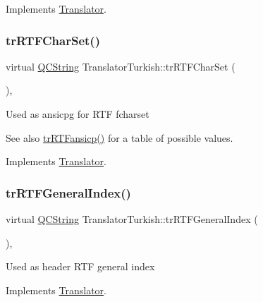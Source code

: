 Implements \mbox{\hyperlink{class_translator_a9953a4c0e6a4fc7d017abcd5c2939e0f}{Translator}}.

\mbox{\label{class_translator_turkish_a6eede957c6533c1d2da465494caf9e15}} 
\subsubsection{\texorpdfstring{trRTFCharSet()}{trRTFCharSet()}}
{\footnotesize\ttfamily virtual \mbox{\hyperlink{class_q_c_string}{Q\+C\+String}} Translator\+Turkish\+::tr\+R\+T\+F\+Char\+Set (\begin{DoxyParamCaption}{ }\end{DoxyParamCaption})\hspace{0.3cm}{\ttfamily [inline]}, {\ttfamily [virtual]}}

Used as ansicpg for R\+TF fcharset \begin{DoxySeeAlso}{See also}
\mbox{\hyperlink{class_translator_turkish_a1280dcd0de6ecb0cc91adc81991770a5}{tr\+R\+T\+Fansicp()}} for a table of possible values. 
\end{DoxySeeAlso}


Implements \mbox{\hyperlink{class_translator_afad391f3cbfb5ce6332b7239f8e2049a}{Translator}}.

\mbox{\label{class_translator_turkish_aa86f9ec7e05904caf1995bb2fbfe2ad9}} 
\subsubsection{\texorpdfstring{trRTFGeneralIndex()}{trRTFGeneralIndex()}}
{\footnotesize\ttfamily virtual \mbox{\hyperlink{class_q_c_string}{Q\+C\+String}} Translator\+Turkish\+::tr\+R\+T\+F\+General\+Index (\begin{DoxyParamCaption}{ }\end{DoxyParamCaption})\hspace{0.3cm}{\ttfamily [inline]}, {\ttfamily [virtual]}}

Used as header R\+TF general index 

Implements \mbox{\hyperlink{class_translator}{Translator}}.

